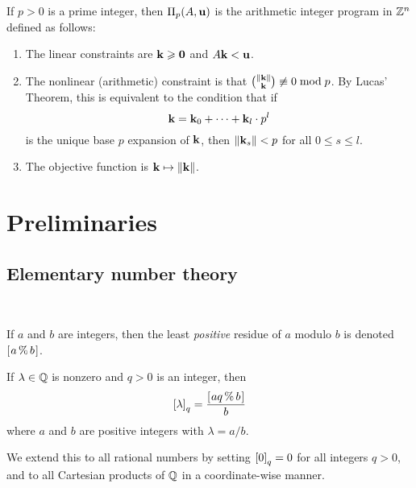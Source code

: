 \documentclass[11pt]{amsart}
\begin{document}


\begin{definition} If $p>0$ is a prime integer, then $\Pi_p(A, \mathbf{u})$ is the arithmetic integer program in $\mathbb{Z}^n$ defined as follows:
\begin{enumerate}
\item The linear constraints are $\mathbf{k} \geqslant \mathbf{0}$ and $A \mathbf{k} < \mathbf{u}$.  
\item The nonlinear (arithmetic) constraint is that $\binom{\| \mathbf{k} \|}{\mathbf{k}} \not \equiv 0 \bmod p$.  By Lucas' Theorem, this is equivalent to the condition that  if \[ \mathbf{k} = \mathbf{k}_0 + \cdots + \mathbf{k}_l \cdot  p^l\] is the unique base $p$ expansion of $\mathbf{k}$, then $\| \mathbf{k}_s \| < p$ for all $0 \leq s \leq l $.
\item The objective function is $\mathbf{k} \mapsto \| \mathbf{k} \|$.
\end{enumerate}
\end{definition}


\newpage

\section{Preliminaries}



\subsection{Elementary number theory}   

\ 


If $a$ and $b$ are integers, then the least \emph{positive} residue of $a$ modulo $b$ is denoted $[ \hspace{.01in} a \, \% \, b \hspace{.01in} ]$. 

\begin{definition}  If $\lambda \in \mathbb{Q}$ is nonzero and $q>0$ is an integer, then \[ \left[ \lambda \right]_q = \frac{ [ \hspace{.01in} aq \, \% \, b \hspace{.01in} ]}{b} \] 
where $a$ and $b$ are positive integers with $\lambda = a/b$.

We extend this to all rational numbers by setting $\left[ 0 \right]_q = 0$ for all integers $q>0$, and to all Cartesian products of $\mathbb{Q}$ in a coordinate-wise manner.
\end{definition}
\end{document}

